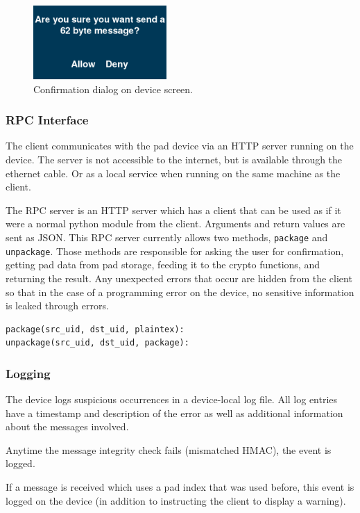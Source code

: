 \documentclass[twocolumn]{article}
\begin{document}
\begin{figure}[htp]
\centering
\includegraphics[width=2in]{confirm}
\caption{Confirmation dialog on device screen.}
\end{figure}

\subsubsection{RPC Interface}
The client communicates with the pad device via an HTTP server running on the device. The server is not accessible to the internet, but is available through the ethernet cable. Or as a local service when running on the same machine as the client.

The RPC server is an HTTP server which has a client that can be used as if it were a normal python module
from the client. Arguments and return values are sent as JSON.
This RPC server currently allows two methods, \texttt{package} and \texttt{unpackage}.
Those methods are responsible for asking the user for confirmation, getting pad data from pad storage, feeding it to the crypto functions, and returning the result. Any unexpected errors that occur are hidden from the client so that in the case of a programming error on the device, no sensitive information is leaked through errors.

\begin{lstlisting}
package(src_uid, dst_uid, plaintex):
unpackage(src_uid, dst_uid, package):
\end{lstlisting}

\subsubsection{Logging}
The device logs suspicious occurrences in a device-local log file.
All log entries have a timestamp and description of the error as well as
additional information about the messages involved.

Anytime the message integrity check fails (mismatched HMAC), the event
is logged.

If a message is received which uses a pad index that was used before,
this event is logged on the device (in addition to instructing the client
to display a warning).
\end{document}
